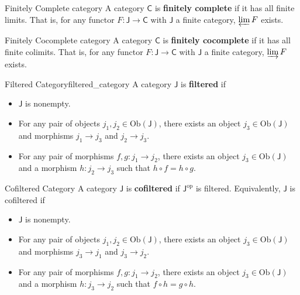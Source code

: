 \begin{definition}{Finitely Complete category}{}
    A category $\mathsf{C}$ is \textbf{finitely complete} if it has all finite limits. That is, for any functor $F:\mathsf{J}\to \mathsf{C}$ with $\mathsf{J}$ a finite category, $\varprojlim F$ exists.
\end{definition}

\begin{definition}{Finitely Cocomplete category}{}
    A category $\mathsf{C}$ is \textbf{finitely cocomplete} if it has all finite colimits. That is, for any functor $F:\mathsf{J}\to \mathsf{C}$ with $\mathsf{J}$ a finite category, $\varinjlim F$ exists.
\end{definition}



\begin{definition}{Filtered Category}{filtered_category}
    A category $\mathsf{J}$ is \textbf{filtered} if 
    \begin{itemize}
        \item $\mathsf{J}$ is nonempty.
        \item For any pair of objects $j_1,j_2\in \mathrm{Ob}(\mathsf{J})$, there exists an object $j_3\in \mathrm{Ob}(\mathsf{J})$ and morphisms $j_1\to j_3$ and $j_2\to j_3$.
        \item For any pair of morphisms $f,g:j_1\to j_2$, there exists an object $j_3\in \mathrm{Ob}(\mathsf{J})$ and a morphism $h:j_2\to j_3$ such that $h\circ f=h\circ g$.
    \end{itemize}
\end{definition}

\begin{definition}{Cofiltered Category}{}
    A category $\mathsf{J}$ is \textbf{cofiltered} if $\mathsf{J}^{\mathrm{op}}$ is filtered. Equivalently, $\mathsf{J}$ is cofiltered if
    \begin{itemize}
        \item $\mathsf{J}$ is nonempty.
        \item For any pair of objects $j_1,j_2\in \mathrm{Ob}(\mathsf{J})$, there exists an object $j_3\in \mathrm{Ob}(\mathsf{J})$ and morphisms $j_3\to j_1$ and $j_3\to j_2$.
        \item For any pair of morphisms $f,g:j_1\to j_2$, there exists an object $j_3\in \mathrm{Ob}(\mathsf{J})$ and a morphism $h:j_3\to j_2$ such that $f\circ h=g\circ h$.
    \end{itemize}
\end{definition}

